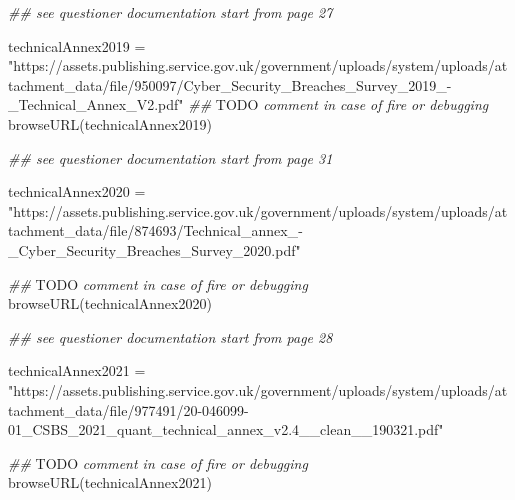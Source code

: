 \documentclass[
  a4paper,
  DIV=11,
  numbers=noendperiod]{scrartcl}
\newenvironment{Shaded}{\begin{snugshade}}{\end{snugshade}}
\newcommand{\AlertTok}[1]{\textcolor[rgb]{0.68,0.00,0.00}{#1}}
\newcommand{\DocumentationTok}[1]{\textcolor[rgb]{0.37,0.37,0.37}{\textit{#1}}}
\newcommand{\FunctionTok}[1]{\textcolor[rgb]{0.28,0.35,0.67}{#1}}
\newcommand{\NormalTok}[1]{\textcolor[rgb]{0.00,0.23,0.31}{#1}}
\newcommand{\OtherTok}[1]{\textcolor[rgb]{0.00,0.23,0.31}{#1}}
\newcommand{\StringTok}[1]{\textcolor[rgb]{0.13,0.47,0.30}{#1}}
\begin{document}
\begin{Shaded}
\begin{Highlighting}[]
\DocumentationTok{\#\# see questioner documentation start from page 27}

\NormalTok{technicalAnnex2019 }\OtherTok{=} \StringTok{"https://assets.publishing.service.gov.uk/government/uploads/system/uploads/attachment\_data/file/950097/Cyber\_Security\_Breaches\_Survey\_2019\_{-}\_Technical\_Annex\_V2.pdf"}
\DocumentationTok{\#\# }\AlertTok{TODO}\DocumentationTok{ comment in case of fire or debugging}
\FunctionTok{browseURL}\NormalTok{(technicalAnnex2019)}
\end{Highlighting}
\end{Shaded}

\begin{Shaded}
\begin{Highlighting}[]
\DocumentationTok{\#\# see questioner documentation start from page 31}

\NormalTok{technicalAnnex2020 }\OtherTok{=} \StringTok{"https://assets.publishing.service.gov.uk/government/uploads/system/uploads/attachment\_data/file/874693/Technical\_annex\_{-}\_Cyber\_Security\_Breaches\_Survey\_2020.pdf"}

\DocumentationTok{\#\# }\AlertTok{TODO}\DocumentationTok{ comment in case of fire or debugging}
\FunctionTok{browseURL}\NormalTok{(technicalAnnex2020)}
\end{Highlighting}
\end{Shaded}

\begin{Shaded}
\begin{Highlighting}[]
\DocumentationTok{\#\# see questioner documentation start from page 28}

\NormalTok{technicalAnnex2021 }\OtherTok{=} \StringTok{"https://assets.publishing.service.gov.uk/government/uploads/system/uploads/attachment\_data/file/977491/20{-}046099{-}01\_CSBS\_2021\_quant\_technical\_annex\_v2.4\_\_clean\_\_190321.pdf"}

\DocumentationTok{\#\# }\AlertTok{TODO}\DocumentationTok{ comment in case of fire or debugging}
\FunctionTok{browseURL}\NormalTok{(technicalAnnex2021)}
\end{Highlighting}
\end{Shaded}
\end{document}
